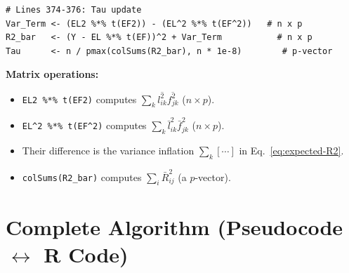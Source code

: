 \documentclass[11pt]{article}
\newcommand{\lbar}[2]{\bar{l}_{#1#2}}
\newcommand{\fbar}[2]{\bar{f}_{#1#2}}
\newcommand{\lsec}[2]{\overline{l^2_{#1#2}}}
\newcommand{\fsec}[2]{\overline{f^2_{#1#2}}}
\newcommand{\coderef}[1]{{\color{blue!70!black}\texttt{#1}}}
\begin{document}
\begin{codebox}
\begin{lstlisting}[style=Rstyle]
# Lines 374-376: Tau update
Var_Term <- (EL2 %*% t(EF2)) - (EL^2 %*% t(EF^2))   # n x p
R2_bar   <- (Y - EL %*% t(EF))^2 + Var_Term           # n x p
Tau      <- n / pmax(colSums(R2_bar), n * 1e-8)        # p-vector
\end{lstlisting}
\textbf{Matrix operations:}
\begin{itemize}[noitemsep]
\item \coderef{EL2 \%*\% t(EF2)} computes $\sum_k \lsec{i}{k}\fsec{j}{k}$ ($n\times p$).
\item \coderef{EL\^{}2 \%*\% t(EF\^{}2)} computes $\sum_k \lbar{i}{k}^2 \fbar{j}{k}^2$ ($n\times p$).
\item Their difference is the variance inflation $\sum_k[\cdots]$ in Eq.~\eqref{eq:expected-R2}.
\item \coderef{colSums(R2\_bar)} computes $\sum_i \bar{R}^2_{ij}$ (a $p$-vector).
\end{itemize}
\end{codebox}

\section{Complete Algorithm (Pseudocode $\leftrightarrow$ R Code)}
\label{sec:algorithm}
\end{document}
